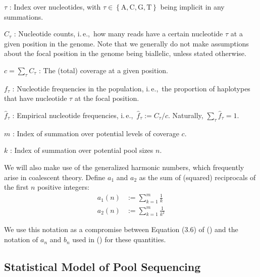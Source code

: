 \documentclass[letterpaper,fontsize=9pt,DIV=12]{scrartcl}
\newcommand\citeay[1]{\citeauthor{#1} (\citeyear{#1}) \cite{#1}}
\newcommand{\samplesize}{n}
\newcommand{\coverage}{c}
\newcommand{\empfreq}{\widehat{f}}
\newcommand{\ie}{i.\,e.,~}
\begin{document}
$\tau$ :
Index over nucleotides, with $\tau \in \left\{ \text{A}, \text{C}, \text{G}, \text{T} \right\}$ being implicit in any summations.

$C_\tau$ :
Nucleotide counts, \ie how many reads have a certain nucleotide $\tau$ at a given position in the genome. Note that we generally do not make assumptions about the focal position in the genome being biallelic, unless stated otherwise.

$\coverage = \sum_\tau C_\tau$ : The (total) coverage at a given position.

$f_\tau$ :
Nucleotide frequencies in the population, \ie the proportion of haplotypes that have nucleotide $\tau$ at the focal position.

$\empfreq_\tau$ :
Empirical nucleotide frequencies, \ie $\empfreq_\tau := C_\tau / \coverage$. Naturally, $\sum_\tau \empfreq_\tau = 1$.


$m$ :
Index of summation over potential levels of coverage $\coverage$.

$k$ :
Index of summation over potential pool sizes $\samplesize$.




We will also make use of the generalized harmonic numbers, which frequently arise in coalescent theory.  Define $a_1$ and $a_2$ as the sum of (squared) reciprocals of the first $n$ positive integers:
%
\begin{align}
    \label{eq:an}
    a_1(n) &:= \sum_{k=1}^{m} \frac{1}{k}
    \\
    \label{eq:bn}
    a_2(n) &:= \sum_{k=1}^{m} \frac{1}{k^2}
\end{align}
%


We use this notation as a compromise between Equation (3.6) of \citeay{Hahn2018} and the notation of $a_n$ and $b_n$ used in \citeay{Achaz2008} for these quantities.

\subsection{Statistical Model of Pool Sequencing}
\label{supp:sec:model}
\end{document}
